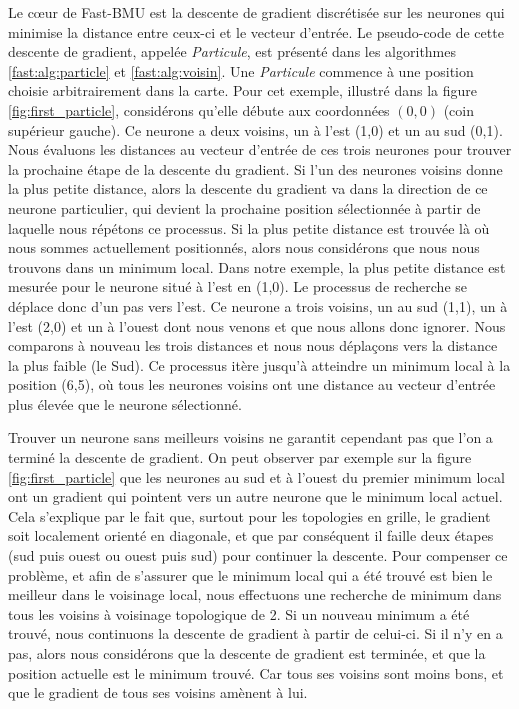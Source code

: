 	Le cœur de Fast-BMU est la descente de gradient discrétisée sur les neurones qui minimise la distance entre ceux-ci et le vecteur d'entrée. Le pseudo-code de cette descente de gradient, appelée \textit{Particule}, est présenté dans les algorithmes \ref{fast:alg:particle} et \ref{fast:alg:voisin}. Une \textit{Particule} commence à une position choisie arbitrairement dans la carte. Pour cet exemple, illustré dans la figure \ref{fig:first_particle}, considérons qu'elle débute aux coordonnées $(0,0)$ (coin supérieur gauche). Ce neurone a deux voisins, un à l'est (1,0) et un au sud (0,1). Nous évaluons les distances au vecteur d'entrée de ces trois neurones pour trouver la prochaine étape de la descente du gradient. Si l'un des neurones voisins donne la plus petite distance, alors la descente du gradient va dans la direction de ce neurone particulier, qui devient la prochaine position sélectionnée à partir de laquelle nous répétons ce processus. Si la plus petite distance est trouvée là où nous sommes actuellement positionnés, alors nous considérons que nous nous trouvons dans un minimum local. Dans notre exemple, la plus petite distance est mesurée pour le neurone situé à l'est en (1,0). Le processus de recherche se déplace donc d'un pas vers l'est. Ce neurone a trois voisins, un au sud (1,1), un à l'est (2,0) et un à l'ouest dont nous venons et que nous allons donc ignorer. Nous comparons à nouveau les trois distances et nous nous déplaçons vers la distance la plus faible (le Sud). Ce processus itère jusqu'à atteindre un minimum local à la position (6,5), où tous les neurones voisins ont une distance au vecteur d'entrée plus élevée que le neurone sélectionné.

	Trouver un neurone sans meilleurs voisins ne garantit cependant pas que l'on a terminé la descente de gradient. On peut observer par exemple sur la figure \ref{fig:first_particle} que les neurones au sud et à l'ouest du premier minimum local ont un gradient qui pointent vers un autre neurone que le minimum local actuel. Cela s'explique par le fait que, surtout pour les topologies en grille, le gradient soit localement orienté en diagonale, et que par conséquent il faille deux étapes (sud puis ouest ou ouest puis sud) pour continuer la descente. Pour compenser ce problème, et afin de s'assurer que le minimum local qui a été trouvé est bien le meilleur dans le voisinage local, nous effectuons une recherche de minimum dans tous les voisins à voisinage topologique de 2. Si un nouveau minimum a été trouvé, nous continuons la descente de gradient à partir de celui-ci. Si il n'y en a pas, alors nous considérons que la descente de gradient est terminée, et que la position actuelle est le minimum trouvé. Car tous ses voisins sont moins bons, et que le gradient de tous ses voisins amènent à lui.

